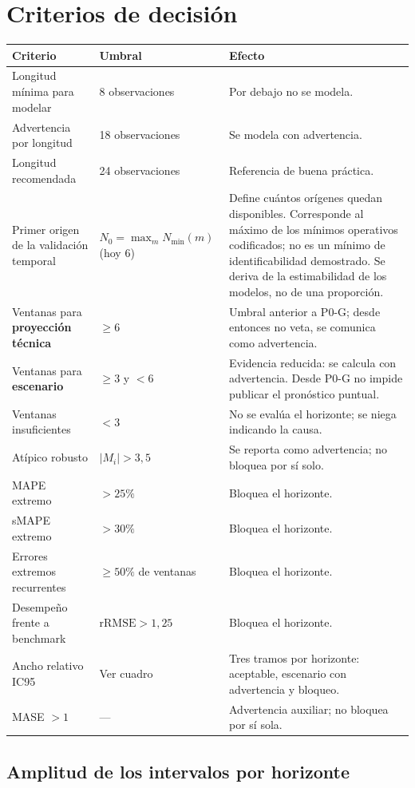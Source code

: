 \documentclass[11pt,letterpaper]{article}
\begin{document}
\section{Criterios de decisión}

\begin{longtable}{@{}p{4.3cm}p{2.4cm}p{7.8cm}@{}}
\toprule
\textbf{Criterio} & \textbf{Umbral} & \textbf{Efecto} \\
\midrule
\endhead
Longitud mínima para modelar & 8 observaciones & Por debajo no se modela. \\
Advertencia por longitud & 18 observaciones & Se modela con advertencia. \\
Longitud recomendada & 24 observaciones & Referencia de buena práctica. \\
Primer origen de la validación temporal & \(N_0=\max_m N_{\min}(m)\) (hoy 6) & Define cuántos orígenes quedan disponibles. Corresponde al máximo de los mínimos operativos codificados; no es un mínimo de identificabilidad demostrado. Se deriva de la estimabilidad de los modelos, no de una proporción. \\
Ventanas para \textbf{proyección técnica} & \(\geq 6\) & Umbral anterior a P0-G; desde entonces no veta, se comunica como advertencia. \\
Ventanas para \textbf{escenario} & \(\geq 3\) y \(< 6\) & Evidencia reducida: se calcula con advertencia. Desde P0-G no impide publicar el pronóstico puntual. \\
Ventanas insuficientes & \(< 3\) & No se evalúa el horizonte; se niega indicando la causa. \\
Atípico robusto & \(|M_i|>3{,}5\) & Se reporta como advertencia; no bloquea por sí solo. \\
MAPE extremo & \(> 25\%\) & Bloquea el horizonte. \\
sMAPE extremo & \(> 30\%\) & Bloquea el horizonte. \\
Errores extremos recurrentes & \(\geq 50\%\) de ventanas & Bloquea el horizonte. \\
Desempeño frente a benchmark & \(\mathrm{rRMSE}>1{,}25\) & Bloquea el horizonte. \\
Ancho relativo IC95 & Ver cuadro & Tres tramos por horizonte: aceptable, escenario con advertencia y bloqueo. \\
MASE \(>1\) & --- & Advertencia auxiliar; no bloquea por sí sola. \\
\bottomrule
\end{longtable}

\subsection{Amplitud de los intervalos por horizonte}
\end{document}
